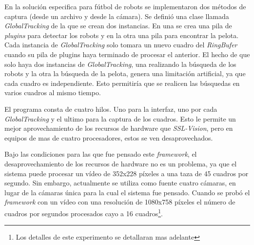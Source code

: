 En la solución especifica para fútbol de robots se implementaron dos métodos de
captura (desde un archivo y desde la cámara). Se definió una clase llamada
\emph{GlobalTracking} de la que se crean dos instancias. En una se crea una pila
de \emph{plugins} para detectar los robots y en la otra una pila para encontrar
la pelota. Cada instancia de \emph{GlobalTracking} solo tomara un nuevo cuadro
del \emph{RingBufer} cuando su pila de plugins haya terminado de procesar el
anterior. El hecho de que solo haya dos instancias de \emph{GlobalTracking}, una
realizando la búsqueda de los robots y la otra la búsqueda de la pelota, genera
una limitación artificial, ya que cada cuadro es independiente. Esto permitiría
que se realicen las búsquedas en varios cuadros al mismo tiempo.

El programa consta de cuatro hilos. Uno para la interfaz, uno por cada
\emph{GlobalTracking} y el ultimo para la captura de los cuadros. Esto le
permite un mejor aprovechamiento de los recursos de hardware que
\emph{SSL-Vision}, pero en equipos de mas de cuatro procesadores, estos se ven
desaprovechados.

Bajo las condiciones para las que fue pensado este \emph{framework}, el
desaprovechamiento de los recursos de hardware no es un problema, ya que el
sistema puede procesar un vídeo de 352x228 píxeles a una taza de 45 cuadros por
segundo. Sin embargo, actualmente se utiliza
como fuente cuatro cámaras, en lugar de la cámaras única para la cual el sistema
fue pensado. Cuando se probó el \emph{framework} con un vídeo con una resolución
de 1080x758 píxeles el número de cuadros por segundos procesados cayo a 16
cuadros\footnote{Los detalles de este experimento se detallaran mas adelante}.

